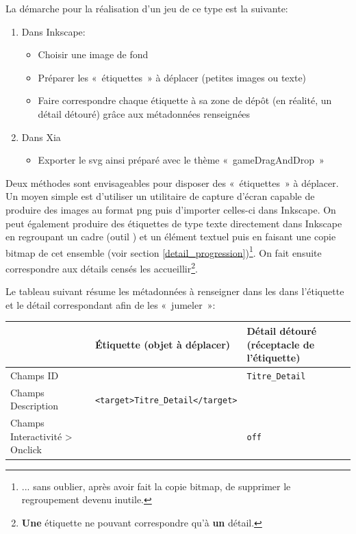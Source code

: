 {La démarche pour la réalisation d'un jeu de ce type est la suivante:
\begin{enumerate}
 \item Dans Inkscape:
\begin{itemize}
 \item Choisir une image de fond
 \item Préparer les «~étiquettes~» à déplacer (petites images ou texte)
 \item Faire correspondre chaque étiquette à sa zone de dépôt (en réalité, un détail détouré)
 grâce aux métadonnées renseignées
\end{itemize}
 \item Dans Xia
 \begin{itemize}
  \item Exporter le svg ainsi préparé avec le thème «~gameDragAndDrop~»
 \end{itemize}
\end{enumerate}

Deux méthodes sont envisageables pour disposer des «~étiquettes~» à déplacer.
Un moyen simple est d'utiliser un utilitaire de capture d'écran 
capable de produire des images au format png puis d'importer celles-ci dans Inkscape.
On peut également produire des étiquettes de type texte directement dans Inkscape en regroupant un 
cadre (outil ) et un élément textuel puis en 
faisant une copie bitmap de cet ensemble (voir section \ref{detail_progression})\footnote{... sans oublier, après avoir
fait la copie bitmap, de supprimer le regroupement devenu inutile.}.
On fait ensuite correspondre aux détails censés les accueillir\footnote{\textbf{Une} étiquette ne pouvant correspondre qu'à \textbf{un} détail.}.

Le tableau suivant résume les métadonnées à renseigner dans les 
dans l'étiquette et le détail correspondant afin de les «~jumeler~»:

\begin{center}
\begin{tabular}{|p{}|p{2.5in}|p{1.5in}|}
\hline
 & Étiquette (objet à déplacer) & Détail détouré (réceptacle de l'étiquette)\\
\hline
Champs ID & & \verb|Titre_Detail|\\
\hline
Champs Description & \verb|<target>Titre_Detail</target>| & \\
\hline
Champs Interactivité > Onclick & & \verb|off|\\
\hline
\end{tabular}
\end{center}

}
